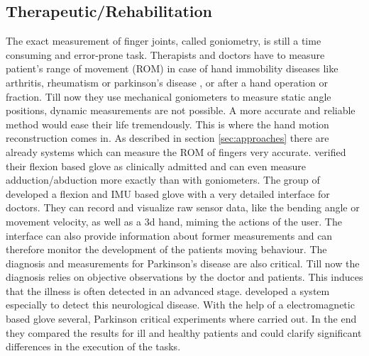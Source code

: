 {

\subsection{Therapeutic/Rehabilitation} \label{subsec:applications:reha}
The exact measurement of finger joints, called goniometry, is still a time consuming and error-prone task. Therapists and doctors have to measure patient's range of movement (ROM) in case of hand immobility diseases like arthritis, rheumatism \cite{o2013novel} or parkinson’s disease \cite{su20033}, or after a hand operation or fraction. Till now they use mechanical goniometers \cite{williams2000goniometric} to measure static angle positions, dynamic measurements are not possible. A more accurate and reliable method would ease their life tremendously. This is where the hand motion reconstruction comes in. As described in section \ref{sec:approaches} there are already systems which can measure the ROM of fingers very accurate. \cite{williams2000goniometric} verified their flexion based glove as clinically admitted and can even measure adduction/abduction more exactly than with goniometers. The group of \cite{o2013novel} developed a flexion and IMU based glove with a very detailed interface for doctors. They can record and visualize raw sensor data, like the bending angle or movement velocity, as well as a 3d hand, miming the actions of the user. The interface can also provide information about former measurements and can therefore monitor the development of the patients moving behaviour. The diagnosis and measurements for Parkinson's disease are also critical. Till now the diagnosis relies on objective observations by the doctor and patients. This induces that the illness is often detected in an advanced stage. \cite{su20033} developed a system especially to detect this neurological disease. With the help of a electromagnetic based glove several, Parkinson critical experiments where carried out. In the end they compared the results for ill and healthy patients and could clarify significant differences in the execution of the tasks.\\
}
